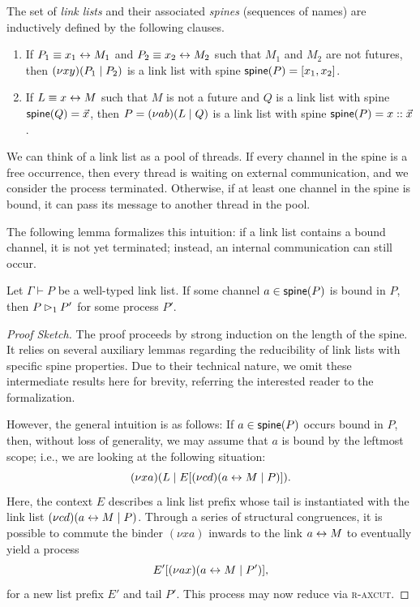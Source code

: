 \begin{definition} \label{def:link-list}
  The set of \emph{link lists} and their associated \emph{spines} (sequences of names) are
  inductively defined by the following clauses.
  \begin{enumerate}[label=(\roman*)]
    \item If $P_1 \equiv x_1 \leftrightarrow M_1$ and $P_2 \equiv x_2 \leftrightarrow M_2$ such that
          $M_1$ and $M_2$ are not futures, then $(\nu x y)(P_1 \mid P_2)$
          is a link list with spine $\mathsf{spine}(P) = [x_1, x_2]$.
    \item If $L \equiv x \leftrightarrow M$ such that $M$ is not a future and
          $Q$ is a link list with spine $\mathsf{spine}(Q) = \vec{x}$, then 
          $P = (\nu a b)(L \mid Q)$ is a link list with spine $\mathsf{spine}(P) = x :: \vec{x}$.
  \end{enumerate}
\end{definition}

We can think of a link list as a pool of threads. If every channel
in the spine is a free occurrence, then every thread is waiting on external communication,
and we consider the process terminated. Otherwise, if at least one channel
in the spine is bound, it can pass its message to another thread in the pool.

The following lemma formalizes this intuition: if a link list contains a bound channel,
it is not yet terminated; instead, an internal communication can still occur.

\begin{lemma} \label{lemma:link-list-reducibility}
  Let $\Gamma \vdash P$ be a well-typed link list. If some channel
  $a \in \mathsf{spine}(P)$ is bound in $P$, then $P \rhd_1 P'$ for some process $P'$.
\end{lemma}
\begin{proof}[Proof Sketch]
  The proof proceeds by strong induction on the length of the spine. It relies
  on several auxiliary lemmas regarding the reducibility of link lists with specific
  spine properties. Due to their technical nature, we omit these intermediate
  results here for brevity, referring the interested reader to the formalization.

  However, the general intuition is as follows: If $a \in \mathsf{spine}(P)$ occurs
  bound in $P$, then, without loss of generality, we may assume that $a$ is bound 
  by the leftmost scope; i.e., we are looking at the following situation:
  \[
    (\nu x a)(L \mid E[(\nu c d)(a \leftrightarrow M \mid P)]).
  \]
  Here, the context $E$ describes a link list prefix whose tail is instantiated 
  with the link list $(\nu c d)(a \leftrightarrow M \mid P)$. Through a series of
  structural congruences, it is possible to commute the binder $(\nu x a)$ 
  inwards to the link $a \leftrightarrow M$ to eventually yield a process
  \[
    E'[(\nu a x)(a \leftrightarrow M \mid P')],
  \]
  for a new list prefix $E'$ and tail $P'$. This process may now reduce via
  \textsc{r-axcut}.
\end{proof}

